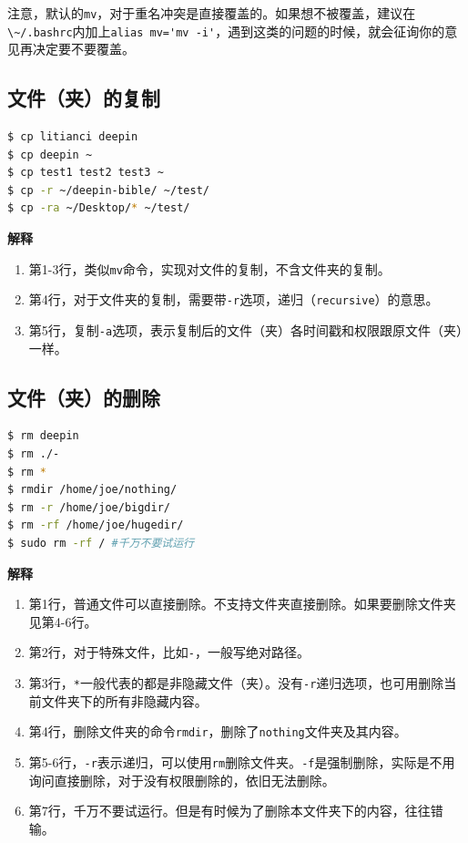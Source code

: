 \documentclass[doctor,openright,twoside]{sjtuthesis}
\providecommand{\tightlist}{%
    \setlength{\itemsep}{0pt}\setlength{\parskip}{0pt}}
\newcommand{\passthrough}[1]{#1}
\theoremstyle{plain}
\theoremstyle{definition}
\theoremstyle{remark}
\theoremstyle{ocrenumbox}
\theoremstyle{plain}
\begin{document}
注意，默认的\passthrough{\lstinline!mv!}，对于重名冲突是直接覆盖的。如果想不被覆盖，建议在\passthrough{\lstinline!\~/.bashrc!}内加上\passthrough{\lstinline!alias mv='mv -i'!}，遇到这类的问题的时候，就会征询你的意见再决定要不要覆盖。

\subsection{文件（夹）的复制}

\begin{lstlisting}[language=bash]
$ cp litianci deepin
$ cp deepin ~
$ cp test1 test2 test3 ~
$ cp -r ~/deepin-bible/ ~/test/
$ cp -ra ~/Desktop/* ~/test/
\end{lstlisting}

\textbf{解释}

\begin{enumerate}
\def\labelenumi{\arabic{enumi}.}
\tightlist
\item
  第1-3行，类似\passthrough{\lstinline!mv!}命令，实现对文件的复制，不含文件夹的复制。
\item
  第4行，对于文件夹的复制，需要带\passthrough{\lstinline!-r!}选项，递归（\passthrough{\lstinline!recursive!}）的意思。
\item
  第5行，复制\passthrough{\lstinline!-a!}选项，表示复制后的文件（夹）各时间戳和权限跟原文件（夹）一样。
\end{enumerate}

\subsection{文件（夹）的删除}

\begin{lstlisting}[language=bash]
$ rm deepin
$ rm ./-
$ rm *
$ rmdir /home/joe/nothing/
$ rm -r /home/joe/bigdir/
$ rm -rf /home/joe/hugedir/
$ sudo rm -rf / #千万不要试运行
\end{lstlisting}

\textbf{解释}

\begin{enumerate}
\def\labelenumi{\arabic{enumi}.}
\tightlist
\item
  第1行，普通文件可以直接删除。不支持文件夹直接删除。如果要删除文件夹见第4-6行。
\item
  第2行，对于特殊文件，比如\passthrough{\lstinline!-!}，一般写绝对路径。
\item
  第3行，\passthrough{\lstinline!*!}一般代表的都是非隐藏文件（夹）。没有\passthrough{\lstinline!-r!}递归选项，也可用删除当前文件夹下的所有非隐藏内容。
\item
  第4行，删除文件夹的命令\passthrough{\lstinline!rmdir!}，删除了\passthrough{\lstinline!nothing!}文件夹及其内容。
\item
  第5-6行，\passthrough{\lstinline!-r!}表示递归，可以使用\passthrough{\lstinline!rm!}删除文件夹。\passthrough{\lstinline!-f!}是强制删除，实际是不用询问直接删除，对于没有权限删除的，依旧无法删除。
\item
  第7行，千万不要试运行。但是有时候为了删除本文件夹下的内容，往往错输。
\end{enumerate}
\end{document}
